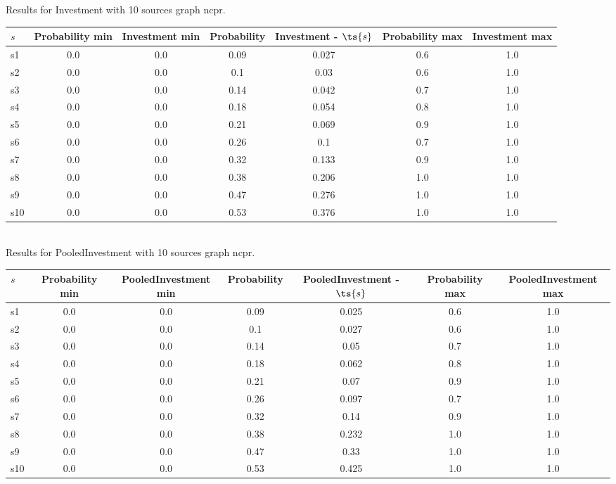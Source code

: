 \documentclass{article}
\begin{document}
\noindent Results for Investment with 10 sources graph ncpr.

\noindent\begin{tabular}{|l|c|c|c|c|c|c|}
\hline
$s$& Probability min & Investment min & Probability & Investment - $\ts{s}$ & Probability max & Investment max\\
\hline
s1 &0.0 & 0.0 & 0.09 & 0.027 & 0.6 & 1.0\\
\hline
s2 &0.0 & 0.0 & 0.1 & 0.03 & 0.6 & 1.0\\
\hline
s3 &0.0 & 0.0 & 0.14 & 0.042 & 0.7 & 1.0\\
\hline
s4 &0.0 & 0.0 & 0.18 & 0.054 & 0.8 & 1.0\\
\hline
s5 &0.0 & 0.0 & 0.21 & 0.069 & 0.9 & 1.0\\
\hline
s6 &0.0 & 0.0 & 0.26 & 0.1 & 0.7 & 1.0\\
\hline
s7 &0.0 & 0.0 & 0.32 & 0.133 & 0.9 & 1.0\\
\hline
s8 &0.0 & 0.0 & 0.38 & 0.206 & 1.0 & 1.0\\
\hline
s9 &0.0 & 0.0 & 0.47 & 0.276 & 1.0 & 1.0\\
\hline
s10 &0.0 & 0.0 & 0.53 & 0.376 & 1.0 & 1.0\\
\hline
\end{tabular}\\

\noindent Results for PooledInvestment with 10 sources graph ncpr.

\noindent\begin{tabular}{|l|c|c|c|c|c|c|}
\hline
$s$& Probability min & PooledInvestment min & Probability & PooledInvestment - $\ts{s}$ & Probability max & PooledInvestment max\\
\hline
s1 &0.0 & 0.0 & 0.09 & 0.025 & 0.6 & 1.0\\
\hline
s2 &0.0 & 0.0 & 0.1 & 0.027 & 0.6 & 1.0\\
\hline
s3 &0.0 & 0.0 & 0.14 & 0.05 & 0.7 & 1.0\\
\hline
s4 &0.0 & 0.0 & 0.18 & 0.062 & 0.8 & 1.0\\
\hline
s5 &0.0 & 0.0 & 0.21 & 0.07 & 0.9 & 1.0\\
\hline
s6 &0.0 & 0.0 & 0.26 & 0.097 & 0.7 & 1.0\\
\hline
s7 &0.0 & 0.0 & 0.32 & 0.14 & 0.9 & 1.0\\
\hline
s8 &0.0 & 0.0 & 0.38 & 0.232 & 1.0 & 1.0\\
\hline
s9 &0.0 & 0.0 & 0.47 & 0.33 & 1.0 & 1.0\\
\hline
s10 &0.0 & 0.0 & 0.53 & 0.425 & 1.0 & 1.0\\
\hline
\end{tabular}\\
\end{document}
